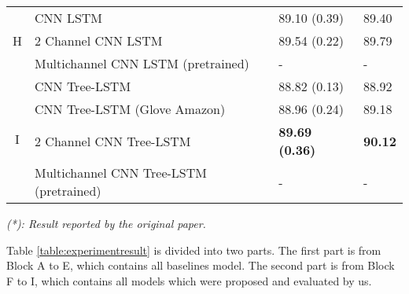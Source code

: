 \begin{table}[H]
\begin{tabular}{c|lll}
\hline
\hline
        \multirow{3}{*}{H} & CNN LSTM                                 & 89.10 (0.39)  & 89.40 \Tstrut  \\
        & 2 Channel CNN LSTM                        & 89.54    (0.22) & 89.79    \\
        & Multichannel CNN LSTM (pretrained) & - & - \\
\hline
        \multirow{4}{*}{I} & CNN Tree-LSTM                            & 88.82 (0.13) & 88.92 \\
        & CNN Tree-LSTM (Glove Amazon)             & 88.96 (0.24) & 89.18 \\
        & 2 Channel CNN Tree-LSTM  &\textbf{89.69 (0.36)} & \textbf{90.12}    \\
        & Multichannel CNN Tree-LSTM (pretrained)        & - & -        \\
    \end{tabular}
\end{table}

\textit{(*): Result reported by the original paper.}


Table \ref{table:experimentresult} is divided into two parts.
The first part is from Block A to E, which contains all baselines model.
The second part is from Block F to I, which contains all models which were proposed and evaluated by us.

